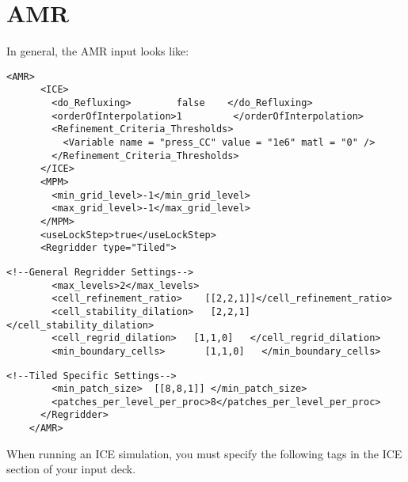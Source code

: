 \section{AMR} \label{Sec:AMR}

In general, the AMR input looks like:

\begin{Verbatim}[fontsize=\footnotesize]
  <AMR>
      <ICE>
        <do_Refluxing>        false    </do_Refluxing>
        <orderOfInterpolation>1         </orderOfInterpolation>
        <Refinement_Criteria_Thresholds>
          <Variable name = "press_CC" value = "1e6" matl = "0" />
        </Refinement_Criteria_Thresholds>
      </ICE>
      <MPM>
        <min_grid_level>-1</min_grid_level>
        <max_grid_level>-1</max_grid_level>
      </MPM>
      <useLockStep>true</useLockStep>    
      <Regridder type="Tiled">
\end{Verbatim}
\begin{Verbatim}[fontsize=\footnotesize]
        <!--General Regridder Settings-->
        <max_levels>2</max_levels>
        <cell_refinement_ratio>    [[2,2,1]]</cell_refinement_ratio>
        <cell_stability_dilation>   [2,2,1]   </cell_stability_dilation>
        <cell_regrid_dilation>   [1,1,0]   </cell_regrid_dilation>
        <min_boundary_cells>       [1,1,0]   </min_boundary_cells>
\end{Verbatim}     
        
\begin{Verbatim}[fontsize=\footnotesize]
        <!--Tiled Specific Settings-->
        <min_patch_size>  [[8,8,1]] </min_patch_size>
        <patches_per_level_per_proc>8</patches_per_level_per_proc>         
      </Regridder>
    </AMR>

\end{Verbatim}

When running an ICE simulation, you must specify the following tags in the ICE section of your input deck.

